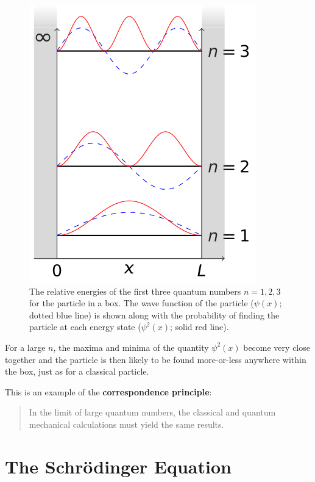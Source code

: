 \documentclass[
]{book}
\begin{document}
\begin{figure}

{\centering \includegraphics[width=0.7\linewidth]{visualisations/LaTeX/ch18-particleinbox123} 

}

\caption{The relative energies of the first three quantum numbers $n = 1, 2, 3$ for the particle in a box. The wave function of the particle ($\psi(x)$; dotted blue line) is shown along with the probability of finding the particle at each energy state ($\psi^2(x)$; solid red line). }\label{fig:ch17-partbox1}
\end{figure}

For a large \(n\), the maxima and minima of the quantity \(\psi^2(x)\) become very close together and the particle is then likely to be found more-or-less anywhere within the box, just as for a classical particle.

This is an example of the \textbf{correspondence principle}:

\begin{quote}
In the limit of large quantum numbers, the classical and quantum mechanical calculations must yield the same results.
\end{quote}

\hypertarget{sec:ch18-schrodinger}{%
\chapter{The Schrödinger Equation}\label{sec:ch18-schrodinger}}
\end{document}

